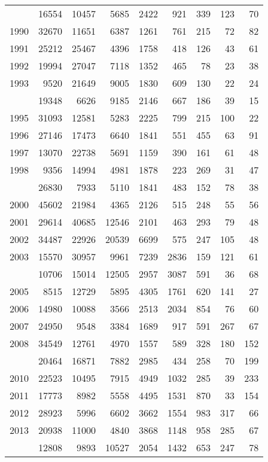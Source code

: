 \documentclass[
]{article}
\begin{document}
\begin{longtable}[t]{lrrrrrrrr}
\endfoot
\bottomrule
\endlastfoot
1989 & 16554 & 10457 & 5685 & 2422 & 921 & 339 & 123 & 70\\
1990 & 32670 & 11651 & 6387 & 1261 & 761 & 215 & 72 & 82\\
1991 & 25212 & 25467 & 4396 & 1758 & 418 & 126 & 43 & 61\\
1992 & 19994 & 27047 & 7118 & 1352 & 465 & 78 & 23 & 38\\
1993 & 9520 & 21649 & 9005 & 1830 & 609 & 130 & 22 & 24\\
\addlinespace
1994 & 19348 & 6626 & 9185 & 2146 & 667 & 186 & 39 & 15\\
1995 & 31093 & 12581 & 5283 & 2225 & 799 & 215 & 100 & 22\\
1996 & 27146 & 17473 & 6640 & 1841 & 551 & 455 & 63 & 91\\
1997 & 13070 & 22738 & 5691 & 1159 & 390 & 161 & 61 & 48\\
1998 & 9356 & 14994 & 4981 & 1878 & 223 & 269 & 31 & 47\\
\addlinespace
1999 & 26830 & 7933 & 5110 & 1841 & 483 & 152 & 78 & 38\\
2000 & 45602 & 21984 & 4365 & 2126 & 515 & 248 & 55 & 56\\
2001 & 29614 & 40685 & 12546 & 2101 & 463 & 293 & 79 & 48\\
2002 & 34487 & 22926 & 20539 & 6699 & 575 & 247 & 105 & 48\\
2003 & 15570 & 30957 & 9961 & 7239 & 2836 & 159 & 121 & 61\\
\addlinespace
2004 & 10706 & 15014 & 12505 & 2957 & 3087 & 591 & 36 & 68\\
2005 & 8515 & 12729 & 5895 & 4305 & 1761 & 620 & 141 & 27\\
2006 & 14980 & 10088 & 3566 & 2513 & 2034 & 854 & 76 & 60\\
2007 & 24950 & 9548 & 3384 & 1689 & 917 & 591 & 267 & 67\\
2008 & 34549 & 12761 & 4970 & 1557 & 589 & 328 & 180 & 152\\
\addlinespace
2009 & 20464 & 16871 & 7882 & 2985 & 434 & 258 & 70 & 199\\
2010 & 22523 & 10495 & 7915 & 4949 & 1032 & 285 & 39 & 233\\
2011 & 17773 & 8982 & 5558 & 4495 & 1531 & 870 & 33 & 154\\
2012 & 28923 & 5996 & 6602 & 3662 & 1554 & 983 & 317 & 66\\
2013 & 20938 & 11000 & 4840 & 3868 & 1148 & 958 & 285 & 67\\
\addlinespace
2014 & 12808 & 9893 & 10527 & 2054 & 1432 & 653 & 247 & 78\\

\end{longtable}
\end{document}
